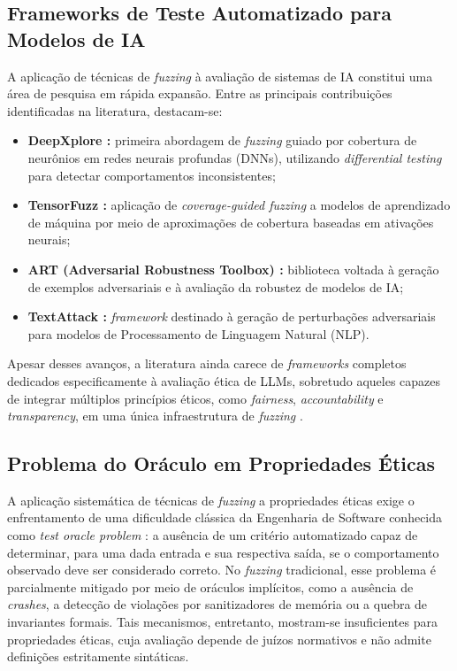 \subsection{Frameworks de Teste Automatizado para Modelos de IA}
\label{sec:fuzzing-ia}

A aplicação de técnicas de \textit{fuzzing} à avaliação de sistemas de IA constitui uma área de pesquisa em rápida expansão. Entre as principais contribuições identificadas na literatura, destacam-se:

\begin{itemize}
    \item \textbf{DeepXplore \cite{Pei2017}:} primeira abordagem de \textit{fuzzing} guiado por cobertura de neurônios em redes neurais profundas (DNNs), utilizando \textit{differential testing} para detectar comportamentos inconsistentes;
    
    \item \textbf{TensorFuzz \cite{Odena2019}:} aplicação de \textit{coverage-guided fuzzing} a modelos de aprendizado de máquina por meio de aproximações de cobertura baseadas em ativações neurais;
    
    \item \textbf{ART (Adversarial Robustness Toolbox) \cite{Nicolae2018}:} biblioteca voltada à geração de exemplos adversariais e à avaliação da robustez de modelos de IA;
    
    \item \textbf{TextAttack \cite{Morris2020}:} \textit{framework} destinado à geração de perturbações adversariais para modelos de Processamento de Linguagem Natural (NLP).
\end{itemize}

Apesar desses avanços, a literatura ainda carece de \textit{frameworks} completos dedicados especificamente à avaliação ética de LLMs, sobretudo aqueles capazes de integrar múltiplos princípios éticos, como \textit{fairness}, \textit{accountability} e \textit{transparency}, em uma única infraestrutura de \textit{fuzzing} \cite{Morales2025, Bouchard2025}.

\subsection{Problema do Oráculo em Propriedades Éticas}
\label{sec:oracle-problem}

A aplicação sistemática de técnicas de \textit{fuzzing} a propriedades éticas exige o enfrentamento de uma dificuldade clássica da Engenharia de Software conhecida como \textit{test oracle problem} \cite{Barr2015}: a ausência de um critério automatizado capaz de determinar, para uma dada entrada e sua respectiva saída, se o comportamento observado deve ser considerado correto. No \textit{fuzzing} tradicional, esse problema é parcialmente mitigado por meio de oráculos implícitos, como a ausência de \textit{crashes}, a detecção de violações por sanitizadores de memória ou a quebra de invariantes formais. Tais mecanismos, entretanto, mostram-se insuficientes para propriedades éticas, cuja avaliação depende de juízos normativos e não admite definições estritamente sintáticas.

